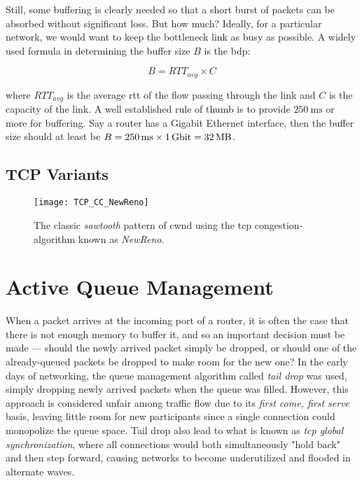 Still, some buffering is clearly needed so that a short burst of packets can be absorbed without significant loss. But how much? Ideally, for a particular network, we would want to keep the bottleneck link as busy as possible. A widely used formula in determining the buffer size $B$ is the \gls{bdp}:

\begin{equation}
    B = RTT_{avg} \times C
\end{equation}

where $RTT_{avg}$ is the average \gls{rtt} of the flow passing through the link and $C$ is the capacity of the link. A well established rule of thumb is to provide $\SI{250}{\milli\second}$ or more for buffering. \cite{sizing_router_buffers} Say a router has a Gigabit Ethernet interface, then the buffer size should at least be $B = \SI{250}{\milli\second} \times \SI{1}{\giga\bit} = \SI{32}{\mega\byte}$.




\subsection{TCP Variants}


\begin{figure}[H]
    \centering
    \texttt{[image: TCP\_CC\_NewReno]}
    \captionsetup{width=0.6\textwidth}
    \caption{The classic \textit{sawtooth} pattern of \gls{cwnd} using the \gls{tcp} congestion-algorithm known as \textit{NewReno}. }
\end{figure}








\section{Active Queue Management}

When a packet arrives at the incoming port of a router, it is often the case that there is not enough memory to buffer it, and so an important decision must be made --- should the newly arrived packet simply be dropped, or should one of the already-queued packets be dropped to make room for the new one? In the early days of networking, the queue management algorithm called \textit{tail drop} was used, simply dropping newly arrived packets when the queue was filled. However, this approach is considered unfair among traffic flow due to its \textit{first come, first serve} basis, leaving little room for new participants since a single connection could monopolize the queue space. \cite{on_traffic_phase_effects_in_packet_switched_gateways} Tail drop also lead to what is known as \textit{\gls{tcp} global synchronization}, where all connections would both simultaneously "hold back" and then step forward, causing networks to become underutilized and flooded in alternate waves.

